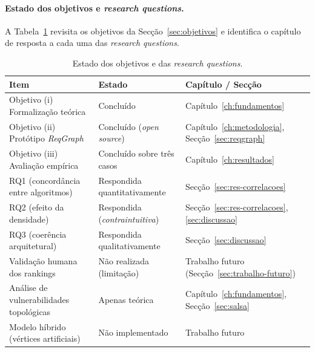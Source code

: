 \paragraph{Estado dos objetivos e \emph{research questions}.} A
Tabela~\ref{tab:estado} revisita os objetivos da
Secção~\ref{sec:objetivos} e identifica o capítulo de resposta a
cada uma das \emph{research questions}.

\begin{table}[ht]
    \centering
    \caption{Estado dos objetivos e das \emph{research questions}.}
    \label{tab:estado}
    \begin{tabular}{@{}l l l@{}}
        \toprule
        \textbf{Item} & \textbf{Estado} & \textbf{Capítulo / Secção} \\
        \midrule
        Objetivo (i) Formalização teórica
            & Concluído
            & Capítulo~\ref{ch:fundamentos} \\
        Objetivo (ii) Protótipo \emph{ReqGraph}
            & Concluído (\emph{open source})
            & Capítulo~\ref{ch:metodologia}, Secção~\ref{sec:reqgraph} \\
        Objetivo (iii) Avaliação empírica
            & Concluído sobre três casos
            & Capítulo~\ref{ch:resultados} \\[4pt]

        RQ1 (concordância entre algoritmos)
            & Respondida quantitativamente
            & Secção~\ref{sec:res-correlacoes} \\
        RQ2 (efeito da densidade)
            & Respondida (\emph{contraintuitiva})
            & Secção~\ref{sec:res-correlacoes}, \ref{sec:discussao} \\
        RQ3 (coerência arquitetural)
            & Respondida qualitativamente
            & Secção~\ref{sec:discussao} \\[4pt]

        Validação humana dos rankings
            & Não realizada (limitação)
            & Trabalho futuro (Secção~\ref{sec:trabalho-futuro}) \\
        Análise de vulnerabilidades topológicas
            & Apenas teórica
            & Capítulo~\ref{ch:fundamentos}, Secção~\ref{sec:salsa} \\
        Modelo híbrido (vértices artificiais)
            & Não implementado
            & Trabalho futuro \\
        \bottomrule
    \end{tabular}
\end{table}

